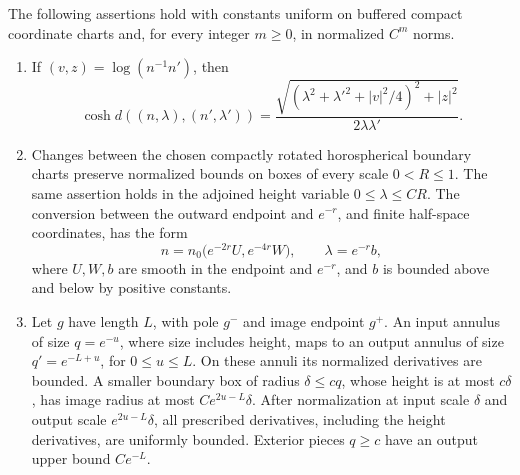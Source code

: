 \begin{lemma}\label{lem:ray-geometry}
The following assertions hold with constants uniform on buffered compact
coordinate charts and, for every integer \(m\ge0\), in normalized
\(C^m\) norms.
\begin{enumerate}[label=(\roman*)]
\item If \((v,z)=\log(n^{-1}n')\), then
\begin{equation}\label{eq:ray-distance}
 \cosh d((n,\lambda),(n',\lambda'))
 =\frac{\sqrt{(\lambda^2+\lambda'^2+|v|^2/4)^2+|z|^2}}
 {2\lambda\lambda'}.
\end{equation}
\item Changes between the chosen compactly rotated horospherical
boundary charts preserve normalized bounds on boxes of every scale
\(0<R\le1\).  The same assertion holds in the
adjoined height variable \(0\le\lambda\le CR\).  The conversion between
the outward endpoint and \(e^{-r}\), and finite half-space coordinates,
has the form
\begin{equation}\label{eq:ray-collar}
 n=n_0\bigl(e^{-2r}U,e^{-4r}W\bigr),\qquad
 \lambda=e^{-r}b,
\end{equation}
where \(U,W,b\) are smooth in the endpoint and \(e^{-r}\), and \(b\)
is bounded above and below by positive constants.
\item Let \(g\) have length \(L\), with pole \(g^-\) and image endpoint
\(g^+\).  An input annulus of size \(q=e^{-u}\), where size includes
height, maps to an output annulus of size \(q'=e^{-L+u}\), for
\(0\le u\le L\).  On these annuli its normalized derivatives are
bounded.  A smaller boundary box of radius \(\delta\le cq\), whose
height is at most \(c\delta\), has image radius at most
\(C e^{2u-L}\delta\).  After normalization at input scale \(\delta\)
and output scale \(e^{2u-L}\delta\), all prescribed derivatives,
including the height derivatives, are uniformly bounded.  Exterior pieces
\(q\ge c\) have an output upper bound \(Ce^{-L}\).
\end{enumerate}
\end{lemma}

